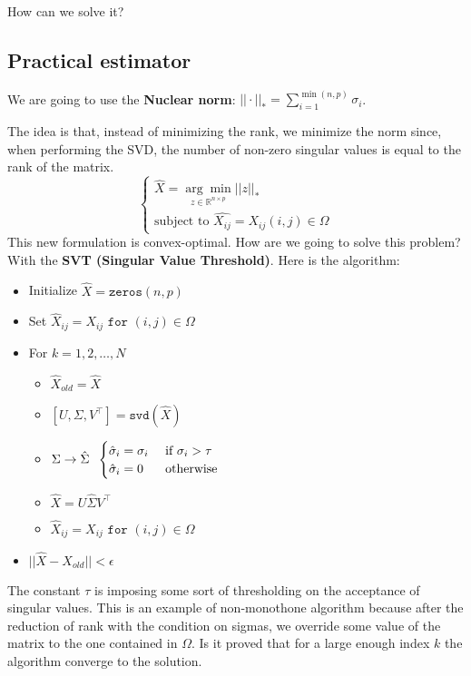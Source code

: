 How can we solve it?

\subsection{Practical estimator}
We are going to use the \textbf{Nuclear norm}: $||\cdot||_*  = \sum\limits_{i=1}^{\min(n,p)}\sigma_i$.

The idea is that, instead of minimizing the rank, we minimize the norm since, when performing the SVD, the number of non-zero singular values is equal to the rank of the matrix.
\[
    \begin{cases}
        \hat{X} = \underset{z \in \mathbb{R}^{n \times p}}{\arg \min} ||z||_*\\
        \text{subject to } \hat{X_{ij}} = X_{ij} (i,j) \in \Omega
    \end{cases}    
\]
This new formulation is convex-optimal. How are we going to solve this problem? With the \textbf{SVT (Singular Value Threshold)}. Here is the algorithm:
\begin{itemize}
    \item Initialize $\hat{X} = \texttt{zeros}(n,p)$
    \item Set $\hat{X}_{ij} = X_{ij} \texttt{ for } (i,j) \in \Omega$
    \item For $k = 1,2, \dots, N$  
    \begin{itemize}
        \item $\hat{X}_{old} = \hat{X}$
        \item $[U, \Sigma, V^\intercal] = \texttt{svd}(\hat{X})$
        \item $\Sigma \rightarrow \hat{\Sigma} \hspace{0.2cm} \begin{cases}
            \hat{\sigma}_i = \sigma_i & \text{ if } \sigma_i > \tau\\
            \hat{\sigma}_i = 0 & \text{ otherwise }
        \end{cases}$
        \item $\hat{X} = U\hat{\Sigma}V^\intercal$
        \item $\hat{X}_{ij} = X_{ij} \texttt{ for } (i,j) \in \Omega$
    \end{itemize}
    \item $||\hat{X} - X_{old}|| < \epsilon$
\end{itemize}
The constant $\tau$ is imposing some sort of thresholding on the acceptance of singular values. This is an example of non-monothone algorithm because after the reduction of rank with the condition on sigmas, we override some value of the matrix to the one contained in $\Omega$. Is it proved that for a large enough index $k$ the algorithm converge to the solution. 